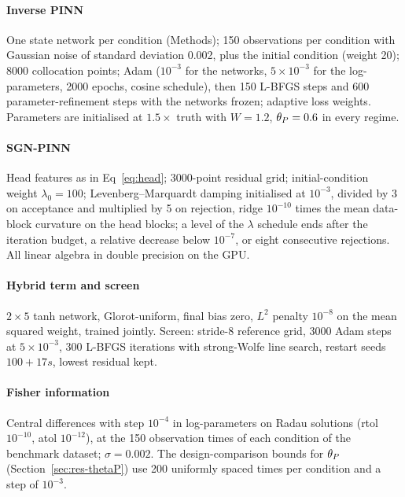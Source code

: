 \paragraph{Inverse PINN} One state network per condition (Methods); 150
observations per condition with Gaussian noise of standard deviation 0.002, plus
the initial condition (weight 20); 8000 collocation points; Adam ($10^{-3}$ for
the networks, $5\times10^{-3}$ for the log-parameters, 2000 epochs, cosine
schedule), then 150 L-BFGS steps and 600 parameter-refinement steps with the
networks frozen; adaptive loss weights. Parameters are initialised at
$1.5\times$ truth with $W=1.2$, $\theta_P=0.6$ in every regime.

\paragraph{SGN-PINN} Head features as in Eq~\eqref{eq:head}; 3000-point
residual grid; initial-condition weight $\lambda_0=100$; Levenberg--Marquardt
damping initialised at $10^{-3}$, divided by 3 on acceptance and multiplied by 5
on rejection, ridge $10^{-10}$ times the mean data-block curvature on the head
blocks; a level of the $\lambda$ schedule ends after the iteration budget, a
relative decrease below $10^{-7}$, or eight consecutive rejections. All linear
algebra in double precision on the GPU.

\paragraph{Hybrid term and screen} $2\times5$ tanh network, Glorot-uniform, final
bias zero, $L^2$ penalty $10^{-8}$ on the mean squared weight, trained jointly.
Screen: stride-8 reference grid, 3000 Adam steps at $5\times10^{-3}$, 300 L-BFGS
iterations with strong-Wolfe line search, restart seeds $100+17s$, lowest
residual kept.

\paragraph{Fisher information} Central differences with step $10^{-4}$ in
log-parameters on Radau solutions (rtol $10^{-10}$, atol $10^{-12}$), at the
150 observation times of each condition of the benchmark dataset;
$\sigma=0.002$. The design-comparison bounds for $\theta_P$
(Section~\ref{sec:res-thetaP}) use 200 uniformly spaced times per condition and a step of $10^{-3}$.
